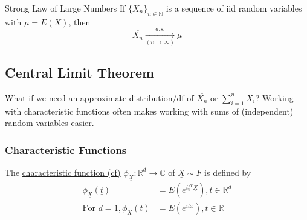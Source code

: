 \documentclass{article}
\newcommand{\R}{\mathbb{R}}
\newcommand{\N}{\mathbb{N}}
\begin{document}
			\begin{mythm}{Strong Law of Large Numbers}{}
				If $\{X_n\}_{n\in\N}$ is a sequence of iid random variables with $\mu=E(X)$, then $$\overline{X_n}\underset{(n\to\infty)}{\overset{a.s.}{\to}}\mu$$
			\end{mythm}
			
			\subsection{Central Limit Theorem}
			
			What if we need an approximate distribution/df of $\overline{X_n}$ or $\sum_{i=1}^nX_i$? Working with characteristic functions often makes working with sums of (independent) random variables easier.
			
			\subsubsection{Characteristic Functions}
			
			\begin{mydef}{}{}
				The \ul{characteristic function (cf)} $\phi_{\underline{X}} : \R^d\to\mathbb{C}$ of $\underline{X}\sim F$ is defined by
				\begin{align*}
					\phi_{\underline{X}}(\underline{t})&=E(e^{i\underline{t}^T\underline{X}}), t\in\R^d\\
					\mbox{For }d=1, \phi_X(t)&=E(e^{itx}), t\in\R
				\end{align*}
			\end{mydef}
			
\end{document}
